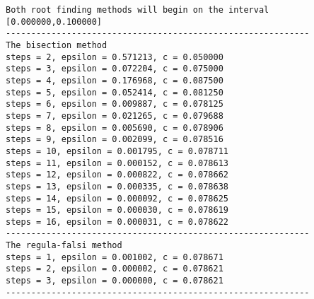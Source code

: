 \documentclass[11pt]{article}
\begin{document}
\label{}
\begin{verbatim}
Both root finding methods will begin on the interval [0.000000,0.100000]
------------------------------------------------------------
The bisection method
steps = 2, epsilon = 0.571213, c = 0.050000
steps = 3, epsilon = 0.072204, c = 0.075000
steps = 4, epsilon = 0.176968, c = 0.087500
steps = 5, epsilon = 0.052414, c = 0.081250
steps = 6, epsilon = 0.009887, c = 0.078125
steps = 7, epsilon = 0.021265, c = 0.079688
steps = 8, epsilon = 0.005690, c = 0.078906
steps = 9, epsilon = 0.002099, c = 0.078516
steps = 10, epsilon = 0.001795, c = 0.078711
steps = 11, epsilon = 0.000152, c = 0.078613
steps = 12, epsilon = 0.000822, c = 0.078662
steps = 13, epsilon = 0.000335, c = 0.078638
steps = 14, epsilon = 0.000092, c = 0.078625
steps = 15, epsilon = 0.000030, c = 0.078619
steps = 16, epsilon = 0.000031, c = 0.078622
------------------------------------------------------------
The regula-falsi method
steps = 1, epsilon = 0.001002, c = 0.078671
steps = 2, epsilon = 0.000002, c = 0.078621
steps = 3, epsilon = 0.000000, c = 0.078621
------------------------------------------------------------
\end{verbatim}
\end{document}
